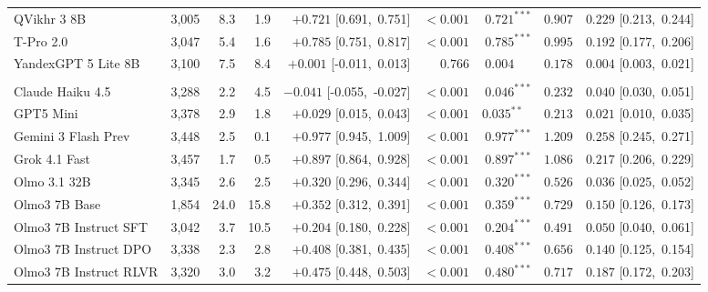 \begin{table}[t]
{\begin{tabular}{l r r r r r r r r}
QVikhr 3 8B & 3,005 & 8.3 & 1.9 & $+0.721$ [0.691,\ 0.751] & $<\!0.001$ & $0.721^{***}$ & $0.907$ & $0.229$ [0.213,\ 0.244] \\
T-Pro 2.0 & 3,047 & 5.4 & 1.6 & $+0.785$ [0.751,\ 0.817] & $<\!0.001$ & $0.785^{***}$ & $0.995$ & $0.192$ [0.177,\ 0.206] \\
YandexGPT 5 Lite 8B & 3,100 & 7.5 & 8.4 & $+0.001$ [-0.011,\ 0.013] & $0.766$ & $0.004^{\phantom{***}}$ & $0.178$ & $0.004$ [0.003,\ 0.021] \\
\midrule
\addlinespace[3pt]
\multicolumn{9}{l}{\textit{\small USA}}\\
\addlinespace[1pt]
Claude Haiku 4.5 & 3,288 & 2.2 & 4.5 & $-0.041$ [-0.055,\ -0.027] & $<\!0.001$ & $0.046^{***}$ & $0.232$ & $0.040$ [0.030,\ 0.051] \\
GPT5 Mini & 3,378 & 2.9 & 1.8 & $+0.029$ [0.015,\ 0.043] & $<\!0.001$ & $0.035^{**\phantom{*}}$ & $0.213$ & $0.021$ [0.010,\ 0.035] \\
Gemini 3 Flash Prev & 3,448 & 2.5 & 0.1 & $+0.977$ [0.945,\ 1.009] & $<\!0.001$ & $0.977^{***}$ & $1.209$ & $0.258$ [0.245,\ 0.271] \\
Grok 4.1 Fast & 3,457 & 1.7 & 0.5 & $+0.897$ [0.864,\ 0.928] & $<\!0.001$ & $0.897^{***}$ & $1.086$ & $0.217$ [0.206,\ 0.229] \\
Olmo 3.1 32B & 3,345 & 2.6 & 2.5 & $+0.320$ [0.296,\ 0.344] & $<\!0.001$ & $0.320^{***}$ & $0.526$ & $0.036$ [0.025,\ 0.052] \\
Olmo3 7B Base & 1,854 & 24.0 & 15.8 & $+0.352$ [0.312,\ 0.391] & $<\!0.001$ & $0.359^{***}$ & $0.729$ & $0.150$ [0.126,\ 0.173] \\
Olmo3 7B Instruct SFT & 3,042 & 3.7 & 10.5 & $+0.204$ [0.180,\ 0.228] & $<\!0.001$ & $0.204^{***}$ & $0.491$ & $0.050$ [0.040,\ 0.061] \\
Olmo3 7B Instruct DPO & 3,338 & 2.3 & 2.8 & $+0.408$ [0.381,\ 0.435] & $<\!0.001$ & $0.408^{***}$ & $0.656$ & $0.140$ [0.125,\ 0.154] \\
Olmo3 7B Instruct RLVR & 3,320 & 3.0 & 3.2 & $+0.475$ [0.448,\ 0.503] & $<\!0.001$ & $0.480^{***}$ & $0.717$ & $0.187$ [0.172,\ 0.203] \\
\bottomrule
\end{tabular}%
}
\end{table}